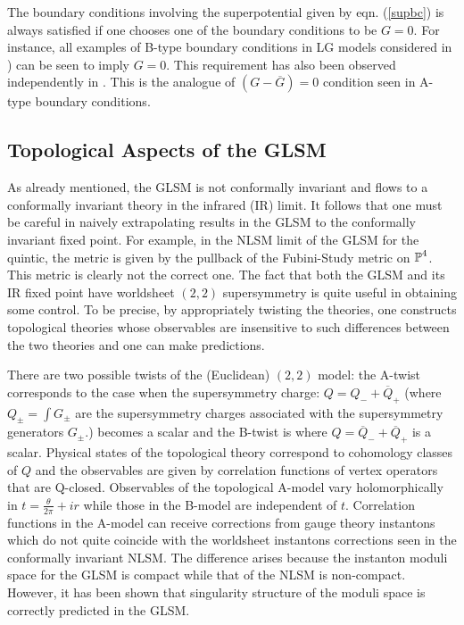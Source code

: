 \documentclass[a4paper,12pt]{article}
\begin{document}
The boundary conditions involving the superpotential given by eqn.
(\ref{supbc}) is always satisfied if one chooses one of the boundary
conditions to be $G=0$. For instance, all examples of B-type
boundary conditions in LG models considered
in \cite{stt}) can be seen to imply $G=0$. This requirement has also
been observed independently  in \cite{HIV}. This is the analogue
of $(G-\overline{G})=0$ condition seen in A-type boundary conditions.


\subsection{Topological Aspects of the GLSM}

As already mentioned, the GLSM is not conformally invariant and
flows to a conformally invariant theory in the infrared (IR) 
limit\cite{wittenphases}. It follows that one must be careful in
naively extrapolating results in the GLSM to the conformally
invariant fixed point. For example, in the NLSM limit of the GLSM
for the quintic, the metric is given by the pullback of
the Fubini-Study metric on $\mbox{$\mathbb P$}^4$. This metric is clearly not the 
correct one.  The fact that both the GLSM and its IR fixed
point have worldsheet $(2,2)$ supersymmetry is quite useful
in obtaining some control. To be precise, by appropriately twisting the
theories, one constructs topological theories whose observables are
insensitive to such differences between the two theories and one
can make predictions.

There are two possible twists of the (Euclidean) $(2,2)$ model: the A-twist 
corresponds to the case when the supersymmetry charge: $Q=Q_-+\overline{Q}_+$
(where $Q_\pm=\int G_\pm$ are the supersymmetry charges associated
with the supersymmetry generators $G_\pm$.)
becomes a scalar and the B-twist is where $Q=\overline{Q}_- + \overline{Q}_+$
is a scalar. Physical states of the topological theory correspond
to cohomology classes of $Q$ and the observables are given by
correlation functions of vertex operators that are Q-closed.
Observables of the topological A-model vary holomorphically in
$t=\frac\theta{2\pi} + i r$ while those in the B-model are independent
of $t$. Correlation functions in the A-model can receive corrections
from gauge theory instantons which do not quite coincide with
the worldsheet instantons corrections seen in the conformally
invariant NLSM. The difference arises because the instanton
moduli space for the GLSM  is compact while that of the NLSM is 
non-compact\cite{wittenphases}. 
However, it has been shown that singularity structure of the moduli
space is correctly predicted in the GLSM\cite{wittenphases,morple}.
\end{document}
